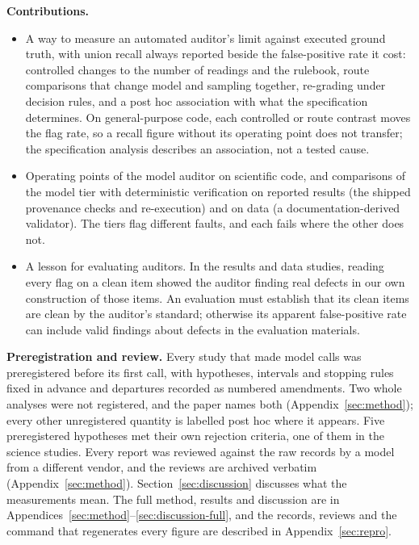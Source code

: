 \textbf{Contributions.}
\begin{itemize}\itemsep1pt
\item A way to measure an automated auditor's limit against executed ground truth, with union recall
  always reported beside the false-positive rate it cost: controlled changes to the number of
  readings and the rulebook, route comparisons that change model and sampling together, re-grading
  under decision rules, and a post hoc association with what the specification determines. On
  general-purpose code, each controlled or route contrast moves the flag rate, so a recall figure
  without its operating point does not transfer; the specification analysis describes an
  association, not a tested cause.
\item Operating points of the model auditor on scientific code, and comparisons of the model tier
  with deterministic verification on reported results (the shipped provenance checks and
  re-execution) and on data (a documentation-derived validator). The tiers flag different faults,
  and each fails where the other does not.
\item A lesson for evaluating auditors. In the results and data studies, reading every flag on a
  clean item showed the auditor finding real defects in our own construction of those items. An
  evaluation must establish that its clean items are clean by the auditor's standard; otherwise its
  apparent false-positive rate can include valid findings about defects in the evaluation materials.
\end{itemize}

\textbf{Preregistration and review.} Every study that made model calls was preregistered before its
first call, with hypotheses, intervals and stopping rules fixed in advance and departures recorded as
numbered amendments. Two whole analyses were not registered, and the paper names both
(Appendix~\ref{sec:method}); every other unregistered quantity is labelled post hoc where it appears.
Five preregistered hypotheses met their own rejection criteria, one of them in the science studies.
Every report was reviewed against the raw records by a model from a different vendor, and the reviews
are archived verbatim (Appendix~\ref{sec:method}). Section~\ref{sec:discussion} discusses what the
measurements mean. The full method, results and discussion are in
Appendices~\ref{sec:method}--\ref{sec:discussion-full}, and the records, reviews and the command that
regenerates every figure are described in Appendix~\ref{sec:repro}.
